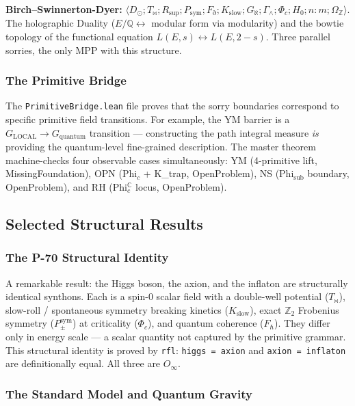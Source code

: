 \documentclass[12pt,a4paper]{article}
\begin{document}
\textbf{Birch--Swinnerton-Dyer:} $\langle D_{\odot}; T_{\bowtie}; R_\text{sup}; P_\text{sym}; F_{\eth}; K_\text{slow}; G_{\aleph}; \Gamma_{\wedge}; \Phi_c; H_0; n{:}m; \Omega_\mathbb{Z} \rangle$. The holographic Duality ($E/\mathbb{Q} \leftrightarrow$ modular form via modularity) and the bowtie topology of the functional equation $L(E, s) \leftrightarrow L(E, 2-s)$. Three parallel sorries, the only MPP with this structure.

\subsubsection{The Primitive Bridge}

The \texttt{PrimitiveBridge.lean} file proves that the sorry boundaries correspond to specific primitive field transitions. For example, the YM barrier is a $G_\text{LOCAL} \to G_\text{quantum}$ transition --- constructing the path integral measure \emph{is} providing the quantum-level fine-grained description. The master theorem machine-checks four observable cases simultaneously: YM (4-primitive lift, MissingFoundation), OPN (Phi$_c$ + K\_trap, OpenProblem), NS (Phi$_\text{sub}$ boundary, OpenProblem), and RH (Phi$_c^\mathbb{C}$ locus, OpenProblem).

\subsection{Selected Structural Results}

\subsubsection{The P-70 Structural Identity}

A remarkable result: the Higgs boson, the axion, and the inflaton are structurally identical synthons. Each is a spin-0 scalar field with a double-well potential ($T_{\bowtie}$), slow-roll / spontaneous symmetry breaking kinetics ($K_\text{slow}$), exact $\mathbb{Z}_2$ Frobenius symmetry ($P_{\pm}^{\text{sym}}$) at criticality ($\Phi_c$), and quantum coherence ($F_{\hbar}$). They differ only in energy scale --- a scalar quantity not captured by the primitive grammar. This structural identity is proved by \texttt{rfl}: \texttt{higgs = axion} and \texttt{axion = inflaton} are definitionally equal. All three are $O_{\infty}$.

\subsubsection{The Standard Model and Quantum Gravity}
\end{document}
